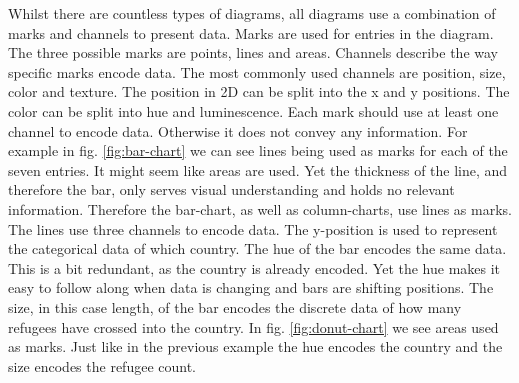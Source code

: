 Whilst there are countless types of diagrams, all diagrams use a combination of marks and channels to present data. Marks are used for entries in the diagram. The three possible marks are points, lines and areas. Channels describe the way specific marks encode data. The most commonly used channels are position, size, color and texture. The position in 2D can be split into the x and y positions. The color can be split into hue and luminescence. Each mark should use at least one channel to encode data. Otherwise it does not convey any information. For example in fig. \ref{fig:bar-chart} we can see lines being used as marks for each of the seven entries. It might seem like areas are used. Yet the thickness of the line, and therefore the bar, only serves visual understanding and holds no relevant information. Therefore the bar-chart, as well as column-charts, use lines as marks. The lines use three channels to encode data. The y-position is used to represent the categorical data of which country. The hue of the bar encodes the same data. This is a bit redundant, as the country is already encoded. Yet the hue makes it easy to follow along when data is changing and bars are shifting positions. The size, in this case length, of the bar encodes the discrete data of how many refugees have crossed into the country. In fig. \ref{fig:donut-chart} we see areas used as marks. Just like in the previous example the hue encodes the country and the size encodes the refugee count. 

